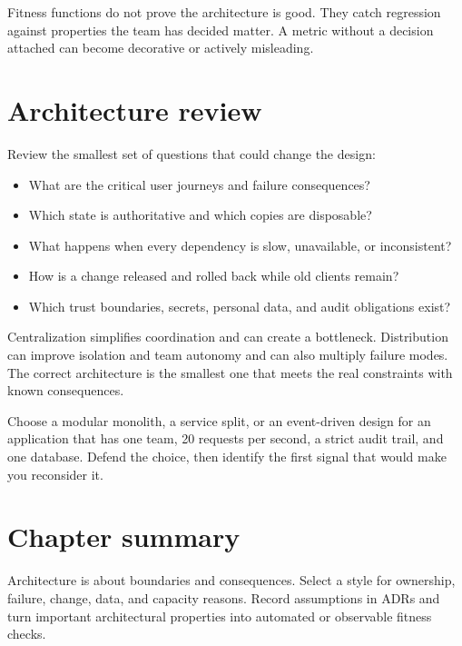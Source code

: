 Fitness functions do not prove the architecture is good. They catch regression
against properties the team has decided matter. A metric without a decision
attached can become decorative or actively misleading.

\section{Architecture review}
Review the smallest set of questions that could change the design:

\begin{itemize}
  \item What are the critical user journeys and failure consequences?
  \item Which state is authoritative and which copies are disposable?
  \item What happens when every dependency is slow, unavailable, or inconsistent?
  \item How is a change released and rolled back while old clients remain?
  \item Which trust boundaries, secrets, personal data, and audit obligations exist?
\end{itemize}

\begin{tradeoffs}
Centralization simplifies coordination and can create a bottleneck. Distribution
can improve isolation and team autonomy and can also multiply failure modes. The
correct architecture is the smallest one that meets the real constraints with
known consequences.
\end{tradeoffs}

\begin{exercise}
Choose a modular monolith, a service split, or an event-driven design for an
application that has one team, 20 requests per second, a strict audit trail, and
one database. Defend the choice, then identify the first signal that would make
you reconsider it.
\end{exercise}

\section{Chapter summary}
Architecture is about boundaries and consequences. Select a style for ownership,
failure, change, data, and capacity reasons. Record assumptions in ADRs and turn
important architectural properties into automated or observable fitness checks.
